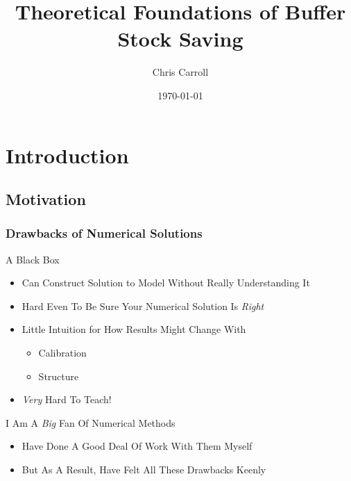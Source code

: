 \documentclass[pdflatex]{beamer}\providecommand{\texname}{BufferStockTheorySlides}%
\title[Buffer Stock Theory]{Theoretical Foundations of Buffer Stock Saving}
\author[Carroll]{Chris Carroll}
\institute[JHU]{Johns Hopkins University}
\date[\today]{\today}
\begin{document}


\begin{frame}[plain]
  \titlepage
\end{frame}


\section{Introduction}
\subsection{Motivation}

\begin{frame}
\frametitle{Drawbacks of Numerical Solutions}


\pause A Black Box \pause
\begin{itemize}
\item Can Construct Solution to Model Without Really Understanding It
\item Hard Even To Be Sure Your Numerical Solution Is {\it Right}
\item Little Intuition for How Results Might Change With
\begin{itemize}
\item Calibration
\item Structure
\end{itemize}
\item {\it Very} Hard To Teach!
\end{itemize}

\medskip\medskip
\pause I Am A {\it Big} Fan Of Numerical Methods
\begin{itemize}
\item Have Done A Good Deal Of Work With Them Myself
\item But As A Result, Have Felt All These Drawbacks Keenly
\end{itemize}



\end{frame}
\end{document}
